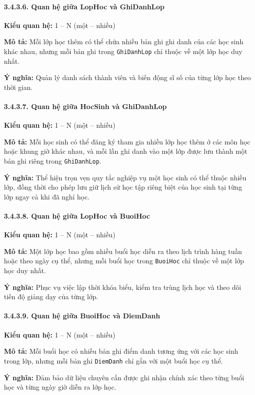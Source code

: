 \documentclass[12pt,a4paper]{article}
\begin{document}
\paragraph{3.4.3.6. Quan hệ giữa LopHoc và GhiDanhLop}\mbox{}\par
\textbf{Kiểu quan hệ:} 1 -- N (một -- nhiều)\par
\textbf{Mô tả:} Mỗi lớp học thêm có thể chứa nhiều bản ghi ghi danh của các học sinh khác nhau, nhưng mỗi bản ghi trong \texttt{GhiDanhLop} chỉ thuộc về một lớp học duy nhất.\par
\textbf{Ý nghĩa:} Quản lý danh sách thành viên và biến động sĩ số của từng lớp học theo thời gian.

\paragraph{3.4.3.7. Quan hệ giữa HocSinh và GhiDanhLop}\mbox{}\par
\textbf{Kiểu quan hệ:} 1 -- N (một -- nhiều)\par
\textbf{Mô tả:} Mỗi học sinh có thể đăng ký tham gia nhiều lớp học thêm ở các môn học hoặc khung giờ khác nhau, và mỗi lần ghi danh vào một lớp được lưu thành một bản ghi riêng trong \texttt{GhiDanhLop}.\par
\textbf{Ý nghĩa:} Thể hiện trọn vẹn quy tắc nghiệp vụ một học sinh có thể thuộc nhiều lớp, đồng thời cho phép lưu giữ lịch sử học tập riêng biệt của học sinh tại từng lớp ngay cả khi đã nghỉ học.

\paragraph{3.4.3.8. Quan hệ giữa LopHoc và BuoiHoc}\mbox{}\par
\textbf{Kiểu quan hệ:} 1 -- N (một -- nhiều)\par
\textbf{Mô tả:} Một lớp học bao gồm nhiều buổi học diễn ra theo lịch trình hàng tuần hoặc theo ngày cụ thể, nhưng mỗi buổi học trong \texttt{BuoiHoc} chỉ thuộc về một lớp học duy nhất.\par
\textbf{Ý nghĩa:} Phục vụ việc lập thời khóa biểu, kiểm tra trùng lịch học và theo dõi tiến độ giảng dạy của từng lớp.

\paragraph{3.4.3.9. Quan hệ giữa BuoiHoc và DiemDanh}\mbox{}\par
\textbf{Kiểu quan hệ:} 1 -- N (một -- nhiều)\par
\textbf{Mô tả:} Mỗi buổi học có nhiều bản ghi điểm danh tương ứng với các học sinh trong lớp, nhưng mỗi bản ghi \texttt{DiemDanh} chỉ gắn với một buổi học cụ thể.\par
\textbf{Ý nghĩa:} Đảm bảo dữ liệu chuyên cần được ghi nhận chính xác theo từng buổi học và từng ngày giờ diễn ra lớp học.
\end{document}
